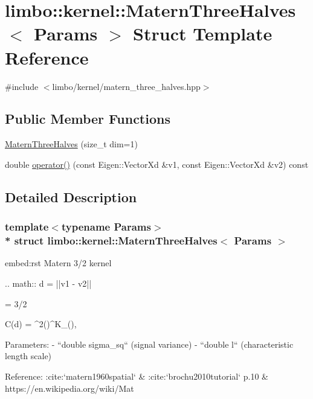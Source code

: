 \hypertarget{structlimbo_1_1kernel_1_1_matern_three_halves}{}\section{limbo\+:\+:kernel\+:\+:Matern\+Three\+Halves$<$ Params $>$ Struct Template Reference}
\label{structlimbo_1_1kernel_1_1_matern_three_halves}


{\ttfamily \#include $<$limbo/kernel/matern\+\_\+three\+\_\+halves.\+hpp$>$}

\subsection*{Public Member Functions}
\begin{DoxyCompactItemize}
\item 
\hyperlink{structlimbo_1_1kernel_1_1_matern_three_halves_a676c205ada09d0ef4ba9ea36d68ba9b9}{Matern\+Three\+Halves} (size\+\_\+t dim=1)
\item 
double \hyperlink{structlimbo_1_1kernel_1_1_matern_three_halves_a9df77c86c2de097bed64edf38a721bb1}{operator()} (const Eigen\+::\+Vector\+Xd \&v1, const Eigen\+::\+Vector\+Xd \&v2) const 
\end{DoxyCompactItemize}


\subsection{Detailed Description}
\subsubsection*{template$<$typename Params$>$\\*
struct limbo\+::kernel\+::\+Matern\+Three\+Halves$<$ Params $>$}

\begin{DoxyVerb}embed:rst
 Matern 3/2 kernel

 .. math::
   d = ||v1 - v2||

   \nu = 3/2

   C(d) = \sigma^2\Bigg(\sqrt{2\nu}\Bigg)^\nu K_\nu\Bigg(\sqrt{2\nu}\Bigg),


 Parameters:
  - ``double sigma_sq`` (signal variance)
  - ``double l`` (characteristic length scale)

Reference: :cite:`matern1960spatial` & :cite:`brochu2010tutorial` p.10 & https://en.wikipedia.org/wiki/Mat%
\end{DoxyVerb}
 

